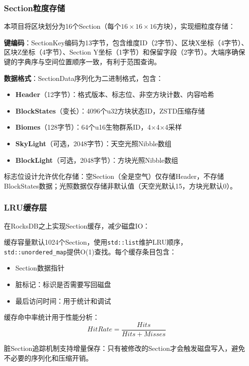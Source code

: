 \subsubsection{Section粒度存储}

本项目将区块划分为16个Section（每个$16\times16\times16$方块），实现细粒度存储：

\textbf{键编码}：SectionKey编码为13字节，包含维度ID（2字节）、区块X坐标（4字节）、区块Z坐标（4字节）、Section Y坐标（1字节）和保留字段（2字节）。大端序确保键的字典序与空间位置顺序一致，有利于范围查询。

\textbf{数据格式}：SectionData序列化为二进制格式，包含：
\begin{itemize}
    \item \textbf{Header}（12字节）：格式版本、标志位、非空方块计数、内容哈希
    \item \textbf{BlockStates}（变长）：4096个u32方块状态ID，ZSTD压缩存储
    \item \textbf{Biomes}（128字节）：64个u16生物群系ID，4$\times$4$\times$4采样
    \item \textbf{SkyLight}（可选，2048字节）：天空光照Nibble数组
    \item \textbf{BlockLight}（可选，2048字节）：方块光照Nibble数组
\end{itemize}

标志位设计允许优化存储：空Section（全是空气）仅存储Header，不存储BlockStates数据；光照数据仅存储非默认值（天空光默认15，方块光默认0）。

\subsubsection{LRU缓存层}

在RocksDB之上实现Section缓存，减少磁盘IO：

缓存容量默认1024个Section，使用\texttt{std::list}维护LRU顺序，\texttt{std::unordered\_map}提供O(1)查找。每个缓存条目包含：
\begin{itemize}
    \item Section数据指针
    \item 脏标记：标识是否需要写回磁盘
    \item 最后访问时间：用于统计和调试
\end{itemize}

缓存命中率统计用于性能分析：
\begin{equation}
HitRate = \frac{Hits}{Hits + Misses}
\end{equation}

脏Section追踪机制支持增量保存：只有被修改的Section才会触发磁盘写入，避免不必要的序列化和压缩开销。

